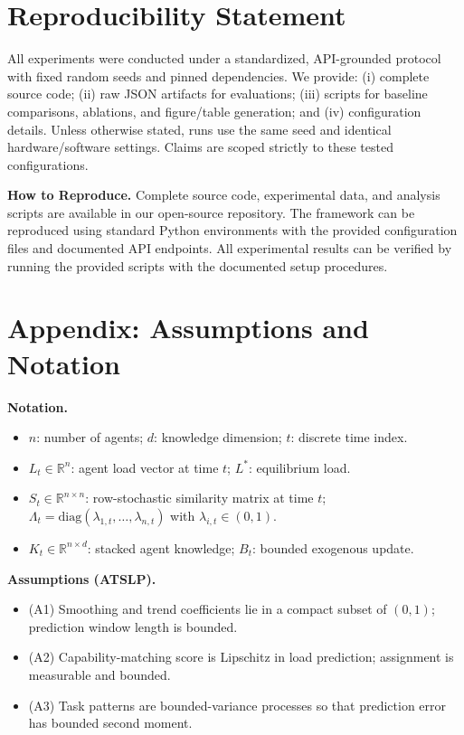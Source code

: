 \documentclass[conference]{IEEEtran}
\begin{document}
\section{Reproducibility Statement}

All experiments were conducted under a standardized, API-grounded protocol with fixed random seeds and pinned dependencies. We provide: (i) complete source code; (ii) raw JSON artifacts for evaluations; (iii) scripts for baseline comparisons, ablations, and figure/table generation; and (iv) configuration details. Unless otherwise stated, runs use the same seed and identical hardware/software settings. Claims are scoped strictly to these tested configurations.

\noindent\textbf{How to Reproduce.} Complete source code, experimental data, and analysis scripts are available in our open-source repository. The framework can be reproduced using standard Python environments with the provided configuration files and documented API endpoints. All experimental results can be verified by running the provided scripts with the documented setup procedures.

\section{Appendix: Assumptions and Notation}

\noindent\textbf{Notation.}
\begin{itemize}
\item $n$: number of agents; $d$: knowledge dimension; $t$: discrete time index.
\item $L_t \in \mathbb{R}^n$: agent load vector at time $t$; $L^*$: equilibrium load.
\item $S_t \in \mathbb{R}^{n\times n}$: row-stochastic similarity matrix at time $t$; $\Lambda_t=\mathrm{diag}(\lambda_{1,t},\dots,\lambda_{n,t})$ with $\lambda_{i,t}\in(0,1)$.
\item $K_t \in \mathbb{R}^{n\times d}$: stacked agent knowledge; $B_t$: bounded exogenous update.
\end{itemize}

\noindent\textbf{Assumptions (ATSLP).}
\begin{itemize}
\item (A1) Smoothing and trend coefficients lie in a compact subset of $(0,1)$; prediction window length is bounded.
\item (A2) Capability-matching score is Lipschitz in load prediction; assignment is measurable and bounded.
\item (A3) Task patterns are bounded-variance processes so that prediction error has bounded second moment.
\end{itemize}
\end{document}

